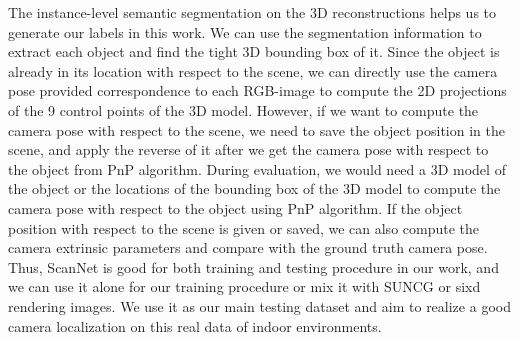 The instance-level semantic segmentation on the 3D reconstructions helps us to generate our labels in this work. We can use the segmentation information to extract each object and find the tight 3D bounding box of it. Since the object is already in its location with respect to the scene, we can directly use the camera pose provided correspondence to each RGB-image to compute the 2D projections of the 9 control points of the 3D model. However, if we want to compute the camera pose with respect to the scene, we need to save the object position in the scene, and apply the reverse of it after we get the camera pose with respect to the object from PnP algorithm. During evaluation, we would need a 3D model of the object or the locations of the bounding box of the 3D model to compute the camera pose with respect to the object using PnP algorithm. If the object position with respect to the scene is given or saved, we can also compute the camera extrinsic parameters and compare with the ground truth camera pose. Thus, ScanNet is good for both training and testing procedure in our work, and we can use it alone for our training procedure or mix it with SUNCG or sixd rendering images. We use it  as our main testing dataset and aim to realize a good camera localization on this real data of indoor environments.

